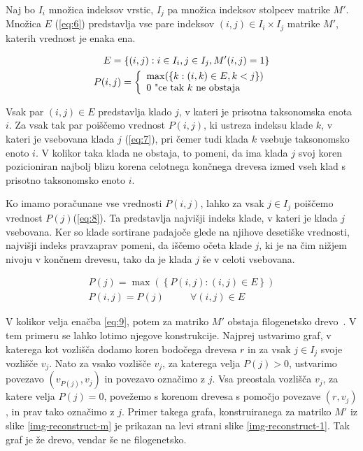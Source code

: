 \documentclass[a4paper, 12pt]{book}
\begin{document}
Naj bo $I_i$ množica indeksov vrstic, $I_j$ pa množica indeksov stolpcev matrike $M'$. Množica $E$ (\ref{eq:6}) predstavlja vse pare indeksov $(i, j) \in I_i \times I_j$ matrike $M'$, katerih vrednost je enaka ena.

\begin{align}
	E = \left\{ {(i, j): i \in I_i, j \in I_j, M'(i, j) = 1} \right\} \label{eq:6} \\
	P(i, j) = 
		\left\{
		\begin{array}{ll}
			\max(\left\{k: (i, k) \in E, k < j\right\}) \\
			0 $      "ce tak $k$ ne obstaja$
		\end{array}
		\right.
	\label{eq:7}
\end{align}

Vsak par $(i, j) \in E$ predstavlja klado $j$, v kateri je prisotna taksonomska enota $i$. Za vsak tak par poiščemo vrednost $P(i, j)$, ki ustreza indeksu klade $k$, v kateri je vsebovana klada $j$ (\ref{eq:7}), pri čemer tudi klada $k$ vsebuje taksonomsko enoto $i$. V kolikor taka klada ne obstaja, to pomeni, da ima klada $j$ svoj koren pozicioniran najbolj blizu korena celotnega končnega drevesa izmed vseh klad s prisotno taksonomsko enoto $i$. 

Ko imamo poračunane vse vrednosti $P(i, j)$, lahko za vsak $j \in I_j$ poiščemo vrednost $P(j)$(\ref{eq:8}). Ta predstavlja najvišji indeks klade, v kateri je klada $j$ vsebovana. Ker so klade sortirane padajoče glede na njihove desetiške vrednosti, najvišji indeks pravzaprav pomeni, da iščemo očeta klade $j$, ki je na čim nižjem nivoju v končnem drevesu, tako da je klada $j$ še v celoti vsebovana.
	
\begin{align}
	P(j) = \max(\left\{P(i, j): (i, j) \in E\right\}) \label{eq:8} \\
	P(i, j) = P(j)   ~~~~~~~~~~~~  \forall (i, j) \in E \label{eq:9}
\end{align}

V kolikor velja enačba \ref{eq:9}, potem za matriko $M'$ obstaja filogenetsko drevo~\cite{gd}. V tem primeru se lahko lotimo njegove konstrukcije. Najprej ustvarimo graf, v katerega kot vozlišča dodamo koren bodočega drevesa $r$ in za vsak $j \in I_j$ svoje vozlišče $v_j$. Nato za vsako vozlišče $v_j$, za katerega velja $P(j) > 0$, ustvarimo povezavo $(v_{P(j)}, v_j)$ in povezavo označimo z $j$. Vsa preostala vozlišča $v_j$, za katere velja $P(j) = 0$, povežemo s korenom drevesa s pomočjo povezave $(r, v_j)$, in prav tako označimo z $j$. Primer takega grafa, konstruiranega za matriko $M'$ iz slike \ref{img-reconstruct-m} je prikazan na levi strani slike \ref{img-reconstruct-1}. Tak graf je že drevo, vendar še ne filogenetsko.
\end{document}
